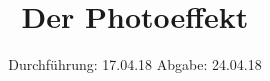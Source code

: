 

\subject{V500}
\title{Der Photoeffekt}
\date{%
  Durchführung: 17.04.18
  \hspace{3em}
  Abgabe: 24.04.18
}



\maketitle
\thispagestyle{empty}
\tableofcontents
\newpage






\printbibliography{}


